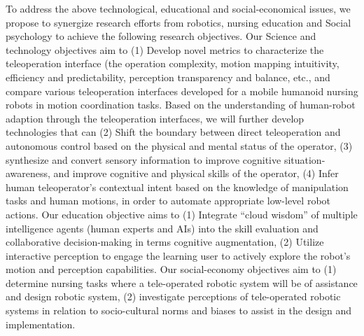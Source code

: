 To address the above technological, educational and social-economical issues, we propose to synergize research efforts from robotics, nursing education and Social psychology to achieve the following research objectives. Our Science and technology objectives aim to (1) Develop novel metrics to characterize the teleoperation interface (the operation complexity, motion mapping intuitivity, efficiency and predictability, perception transparency and balance, etc., and compare various teleoperation interfaces developed for a mobile humanoid nursing robots in motion coordination tasks. Based on the understanding of human-robot adaption through the teleoperation interfaces, we will further develop technologies that can (2) Shift the boundary between direct teleoperation and autonomous control based on the physical and mental status of the operator, (3) synthesize and convert sensory information to improve cognitive situation-awareness, and improve cognitive and physical skills of the operator, (4) Infer human teleoperator's contextual intent based on the knowledge of manipulation tasks and human motions, in order to automate appropriate low-level robot actions.  Our education objective aims to (1) Integrate ``cloud wisdom'' of multiple intelligence agents (human experts and AIs) into the skill evaluation and collaborative decision-making in terms cognitive augmentation, (2) Utilize interactive perception to engage the learning user to actively explore the robot's motion and perception capabilities. Our social-economy objectives aim to (1) determine nursing tasks where a tele-operated robotic system will be of assistance and design robotic system, (2) investigate perceptions of tele-operated robotic systems in relation to socio-cultural norms and biases to assist in the design and implementation. 


\vspace{0.5 em}

